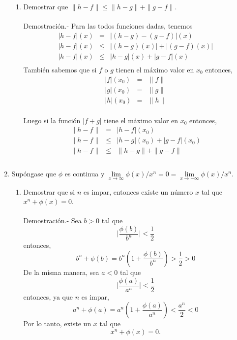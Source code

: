 \begin{enumerate}
\begin{enumerate}[\bfseries (a)]
	\item Demostrar que $\|h-f\|\leq \|h-g\|+\|g-f\|$.\\\\
	    Demostración.-\; Para las todos funciones dadas, tenemos
	    $$\begin{array}{rcl}
		|h-f|(x)&=&|(h-g)-(g-f)|(x)\\
		|h-f|(x)&\leq&|(h-g)(x)|+|(g-f)(x)|\\
		|h-f|(x)&\leq&|h-g|(x)+|g-f|(x)\\
	    \end{array}$$
	    También sabemos que si $f$ o $g$ tienen el máximo valor en $x_0$ entonces,
	    $$\begin{array}{rcl}
		|f|(x_0)&=&\|f\|\\
		|g|(x_0)&=&\|g\|\\
		|h|(x_0)&=&\|h\|\\
	    \end{array}$$

	    Luego si la función $|f+g|$ tiene el máximo valor en $x_0$ entonces,
	    $$\begin{array}{rcl}
		\|h-f\|&=&|h-f|(x_0)\\
		\|h-f\|&\leq&|h-g|(x_0) + |g-f|(x_0)\\
		       \|h-f\|&\leq&\|h-g\| + \|g-f\|\\\\
	    \end{array}$$

    \end{enumerate}
   
\item Supóngase que $\phi$ es continua y $\lim\limits_{x\to\infty} \phi(x)/x^n = 0 = \lim\limits_{x\to -\infty} \phi (x)/x^n$.

    \begin{enumerate}[\bfseries (a)]

	\item Demostrar que si $n$ es impar, entonces existe un número $x$ tal que $x^n+\phi(x)=0$.\\\\
	    Demostración.-\; Sea $b>0$ tal que $$\bigg|\dfrac{\phi(b)}{b^n}\bigg|<\dfrac{1}{2}$$
	    entonces,
	    $$b^n+\phi(b)=b^n\left(1+\dfrac{\phi(b)}{b^n}\right)>\dfrac{1}{2}>0$$
	    De la misma manera, sea $a<0$ tal que
	    $$\bigg|\dfrac{\phi(a)}{a^n}\bigg|<\dfrac{1}{2}$$
	    entonces, ya que $n$ es impar,
	    $$a^n + \phi(a)=a^n\left(1+\dfrac{\phi(a)}{a^n}\right)<\dfrac{a^n}{2}<0$$
	    Por lo tanto, existe un $x$ tal que 
	    $$x^n + \phi(x)=0.$$\\


\end{enumerate}
\end{enumerate}
